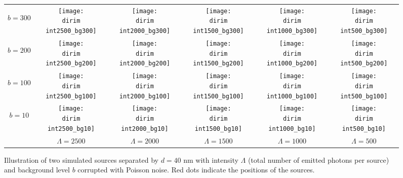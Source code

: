 \begin{figure}[!bt]
	\centering
	\newcommand{\wf}{.15\textwidth}
	\newcommand{\dirim}{\qd gFREM/images/psf2/twosources_}
	\newcommand{\vs}{.4}
	\begin{tabular}{c|ccccc}
		\begin{sideways}\hspace{\vs cm}$b=300$\end{sideways}
		&\texttt{[image: \\dirim int2500\_bg300]}
		&\texttt{[image: \\dirim int2000\_bg300]}
		&\texttt{[image: \\dirim int1500\_bg300]}
		&\texttt{[image: \\dirim int1000\_bg300]}
		&\texttt{[image: \\dirim int500\_bg300]}\\
		\begin{sideways}\hspace{\vs cm}$b=200$\end{sideways}
		&\texttt{[image: \\dirim int2500\_bg200]}
		&\texttt{[image: \\dirim int2000\_bg200]}
		&\texttt{[image: \\dirim int1500\_bg200]}
		&\texttt{[image: \\dirim int1000\_bg200]}
		&\texttt{[image: \\dirim int500\_bg200]}\\
		\begin{sideways}\hspace{\vs cm}$b=100$\end{sideways}
		&\texttt{[image: \\dirim int2500\_bg100]}
		&\texttt{[image: \\dirim int2000\_bg100]}
		&\texttt{[image: \\dirim int1500\_bg100]}
		&\texttt{[image: \\dirim int1000\_bg100]}
		&\texttt{[image: \\dirim int500\_bg100]}\\
		\begin{sideways}\hspace{\vs cm}$b=10$\end{sideways}
		&\texttt{[image: \\dirim int2500\_bg10]}
		&\texttt{[image: \\dirim int2000\_bg10]}
		&\texttt{[image: \\dirim int1500\_bg10]}
		&\texttt{[image: \\dirim int1000\_bg10]}
		&\texttt{[image: \\dirim int500\_bg10]}\\
		\hline	
		&$\Lambda=2500$ & $\Lambda=2000$ & $\Lambda=1500$ & $\Lambda=1000$ & $\Lambda=500$\\
	\end{tabular}
	\caption{Illustration of two simulated sources separated by $d=40$ nm with intensity $\Lambda$ (total number of emitted photons per source) and background level $b$ corrupted with Poisson noise. Red dots indicate the positions of the sources.}
	\label{fig:two sources int bg}
\end{figure}

